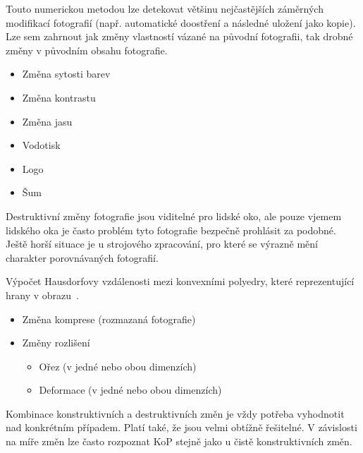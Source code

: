 Touto numerickou metodou lze detekovat většinu nejčastějších záměrných modifikací fotografií (např. automatické doostření a následné uložení jako kopie). Lze sem zahrnout jak změny vlastností vázané na původní fotografii, tak drobné změny v původním obsahu fotografie.

\begin{itemize}
	\setlength{\parskip}{0pt}
	\setlength{\itemsep}{0pt}
	\item{Změna sytosti barev}
	\item{Změna kontrastu}
	\item{Změna jasu}
\end{itemize}

\begin{itemize}
	\setlength{\parskip}{0pt}
	\setlength{\itemsep}{0pt}
	\item{Vodotisk}
	\item{Logo}
	\item{Šum}
\end{itemize}

Destruktivní změny fotografie jsou viditelné pro lidské oko, ale pouze vjemem lidského oka je často problém tyto fotografie bezpečně prohlásit za podobné. Ještě horší situace je u strojového zpracování, pro které se výrazně mění charakter porovnávaných fotografií.

Výpočet Hausdorfovy vzdálenosti mezi konvexními polyedry, které reprezentující hrany v obrazu~\cite{FFT-technique}.

\begin{itemize}
	\setlength{\parskip}{0pt}
	\setlength{\itemsep}{0pt}
	\item{Změna komprese (rozmazaná fotografie)}
	\item{Změny rozlišení}
	\begin{itemize}
		\item{Ořez (v jedné nebo obou dimenzích)}
		\item{Deformace (v jedné nebo obou dimenzích)}
	\end{itemize}
\end{itemize}

Kombinace konstruktivních a destruktivních změn je vždy potřeba vyhodnotit nad konkrétním případem. Platí také, že jsou velmi obtížně řešitelné. V závislosti na míře změn lze často rozpoznat KoP stejně jako u čistě konstruktivních změn.

